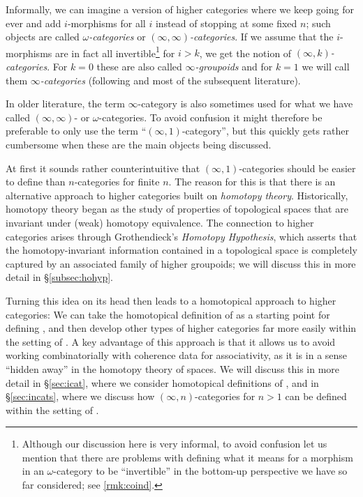 \documentclass[a4paper,11pt]{article}
\begin{document}
Informally, we can imagine a version of higher categories where we
keep going for ever and add $i$-morphisms for all $i$ instead of
stopping at some fixed $n$; such objects are called
\emph{$\omega$-categories} or \emph{$(\infty,\infty)$-categories}. If
we assume that the $i$-morphisms are in fact all
invertible\footnote{Although our discussion here is very informal, to
  avoid confusion let us mention that there are problems with
  defining what it means for a morphism in an $\omega$-category to be
  ``invertible'' in the bottom-up perspective we have so far
  considered; see \cref{rmk:coind}.}  for $i > k$, we get the notion
of \emph{$(\infty,k)$-categories}. For $k = 0$ these are also called
\emph{$\infty$-groupoids} and for $k = 1$ we will call them
\emph{$\infty$-categories} (following \cite{HTT} and most of the
subsequent literature).

\begin{warning}
  In older literature, the term $\infty$-category is also sometimes
  used for what we have called $(\infty,\infty)$- or
  $\omega$-categories. To avoid confusion it might therefore be
  preferable to only use the term ``$(\infty,1)$-category'', but this
  quickly gets rather cumbersome when these are the main objects being
  discussed.
\end{warning}

At first it sounds rather counterintuitive that
$(\infty,1)$-categories should be easier to define than $n$-categories
for finite $n$. The reason for this is that there is an alternative
approach to higher categories built on \emph{homotopy
  theory}. Historically, homotopy theory began as the study of
properties of topological spaces that are invariant under (weak)
homotopy equivalence. The connection to higher categories arises
through Grothendieck's \emph{Homotopy Hypothesis}, which asserts that
the homotopy-invariant information contained in a topological space is
completely captured by an associated family of higher groupoids; we
will discuss this in more detail in \S\ref{subsec:hohyp}.

Turning this idea on its head then leads to a homotopical approach to
higher categories: We can take the homotopical definition of
\igpds{} as a starting point for defining \icats{}, and then
develop other types of higher categories far more easily within the
setting of \icats{}. A key advantage of this approach is that it
allows us to avoid working combinatorially with coherence data for
associativity, as it is in a sense ``hidden away'' in the homotopy
theory of spaces. We will discuss this in more detail in
\S\ref{sec:icat}, where we consider homotopical definitions of
\icats{}, and in \S\ref{sec:incats}, where we discuss
how $(\infty,n)$-categories for $n > 1$ can be defined within the
setting of \icats{}.
\end{document}

